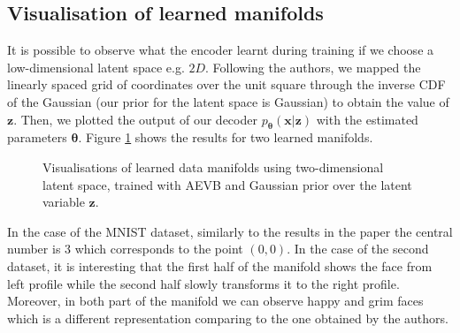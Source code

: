 \documentclass[../report.tex]{subfiles}
\begin{document}
\subsection{Visualisation of learned manifolds}
It is possible to observe what the encoder learnt during training if we choose a low-dimensional latent space e.g. $2D$. Following the authors, we mapped the linearly spaced grid of coordinates over the unit square through the inverse CDF of the Gaussian (our prior for the latent space is Gaussian) to obtain the value of $\mathbf{z}$. Then, we plotted the output of our decoder $p_{\mathbf{\theta}} (\mathbf{x}| \mathbf{z})$ with the estimated parameters $\mathbf{\theta}$. Figure \ref{fig:FREY} shows the results for two learned manifolds.

\begin{figure}[!htb]
%
\begin{center}
\end{center}
\endminipage 
{}  
\begin{center}
\end{center}
\endminipage\hfill

  \caption[1]{Visualisations of learned data manifolds using two-dimensional latent space, trained with AEVB and Gaussian prior over the latent variable $\mathbf{z}$.}
\label{fig:FREY}
\end{figure}

In the case of the MNIST dataset, similarly to the results in the paper the central number is $3$ which corresponds to the point $(0,0)$. In the case of the second dataset, it is interesting that the first half of the manifold shows the face from left profile while the second half slowly transforms it to the right profile. Moreover, in both part of the manifold we can observe happy and grim faces which is a different representation comparing to the one obtained by the authors.
\end{document}
